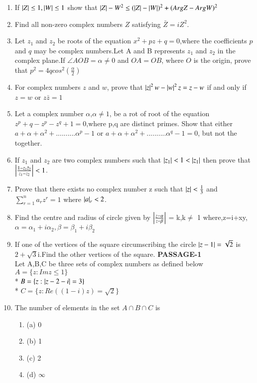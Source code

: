 \begin{enumerate}[label=\arabic*.,ref=\thesubsection.\theenumi]
    \item If $\left\vert Z\right\vert \leq 1, \left\vert W\right\vert \leq 1$ show that 
    $\left\vert Z\right\vert-W^2 \leq (\left\vert Z\right\vert -\left\vert W\right\vert )^2+(ArgZ-ArgW)^2$
    \item Find all non-zero complex numbers $Z$ satisfying $\bar Z = iZ^2$.
    \item Let $z_1$ and $z_2$ be roots of the equation $x^2+pz+q = 0$,where the coefficients $p$ and $q$ may be complex numbers.Let A and B represents $z_1$ and $z_2$ in the complex plane.If $\angle AOB = \alpha \neq 0$ and $OA=OB$, where $O$ is the origin, prove that
    $p^2=4qcos^2 (\frac{\alpha}{2})$
    \item For complex numbers $z$ and $w$, prove that $\left\vert z\right\vert ^2 w - \left\vert w\right\vert^2 z=z-w$ if and only if $z=w$ or  $z\bar z=1$
    \item Let a complex number $\alpha$,$\alpha \neq 1$, be a rot of root of the equation $z^p+q-z^p-z^q+1 = 0$,where p,q are distinct primes. Show that either $a+\alpha+\alpha^2+..........\alpha^p-1$ or $a+\alpha+\alpha^2+..........\alpha^q-1 = 0$, but not the together.
    \item If $z_1$ and $z_2$ are two complex numbers such that $\left\vert z_1\right\vert < 1 < \left\vert z_1\right\vert$ then prove that $\left\vert\frac {1-z_1\bar z_2}{z_1-z_2}\right\vert < 1$. 
    \item Prove that there exists no complex number z such that $\left\vert z\right\vert <\frac{1}{3}$ and $\sum_{r=1}^{n}a_r z ^r=1$ where $\left\vert a\right\vert_r <2$.
    \item Find the centre and radius of circle given by 
    $\left\vert\frac{z-\alpha}{z-\beta}\right\vert$ = k,k$\neq$ 1
    where,z=i+xy, $\alpha = \alpha_1+i \alpha_2,\beta = \beta_1+i \beta_2$
    \item If one of the vertices of the square circumscribing the circle $\left\vert z-1\right\vert=\sqrt 2$ is $2+\sqrt{3}$i.Find the other vertices of the square.
{\textbf{PASSAGE-1}}\\
Let A,B,C be three sets of complex numbers as defined below 
    $A=\{z:Im z\leq 1\}$\\*
    $B=\{z:\left\vert z-2-i\right\vert=3\}$\\*
    $C=\{z:Re((1-i)z)=\sqrt 2\}$
    \item The number of elements in the set $A\cap B \cap C$ is 
    \begin{enumerate}
    \item (a) 0   
    \item (b) 1   
    \item (c) 2   
    \item (d) $\infty$
    \end{enumerate}

\end{enumerate}
